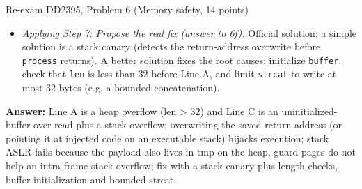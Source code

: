 \documentclass[12pt, a4paper]{article}
\begin{document}
\begin{practicebox}{Re-exam DD2395, Problem 6 (Memory safety, 14 points)}
\begin{itemize}
    \item \textit{Applying Step 7: Propose the real fix (answer to 6f):} Official solution: a simple solution is a stack canary (detects the return-address overwrite before \texttt{process} returns). A better solution fixes the root causes: initialize \texttt{buffer}, check that \texttt{len} is less than 32 before Line A, and limit \texttt{strcat} to write at most 32 bytes (e.g. a bounded concatenation).
\end{itemize}
\textbf{Answer:} Line A is a heap overflow (len > 32) and Line C is an uninitialized-buffer over-read plus a stack overflow; overwriting the saved return address (or pointing it at injected code on an executable stack) hijacks execution; stack ASLR fails because the payload also lives in tmp on the heap, guard pages do not help an intra-frame stack overflow; fix with a stack canary plus length checks, buffer initialization and bounded strcat.
\end{practicebox}
\end{document}
